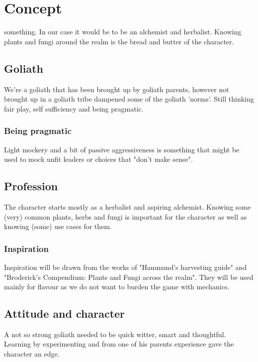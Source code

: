 \chapter{Concept}
\label{concept}

 something. In our case it would be to be an alchemist and herbalist. Knowing plants and fungi around the realm is the bread and butter of the character.

\section{Goliath} 
We're a goliath that has been brought up by goliath parents, however not brought up in a goliath tribe dampened some of the goliath 'norms'. Still thinking fair play, self sufficiency and being pragmatic.

\subsection{Being pragmatic}
Light mockery and a bit of passive aggressiveness is something that might be used to mock unfit leaders or choices that "don't make sense".

\section{Profession}
The character starts mostly as a herbalist and aspiring alchemist. Knowing some (very) common plants, herbs and fungi is important for the character as well as knowing (some) use cases for them.

\subsection{Inspiration}
Inspiration will be drawn from the works of "Hammund's harvesting guide" and "Broderick's Compendium: Plants and Fungi across the realm". They will be used mainly for flavour as we do not want to burden the game with mechanics.

\section{Attitude and character}
A not so strong goliath needed to be quick witter, smart and thoughtful. Learning by experimenting and from one of his parents experience gave the character an edge.

